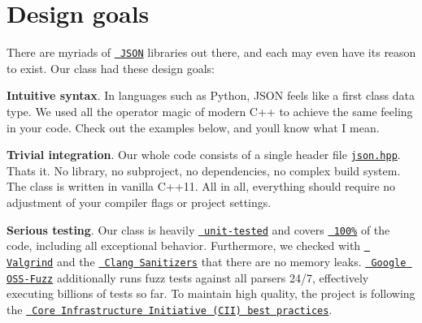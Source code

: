 \chapter{Design goals}
\hypertarget{md_build_2dt__core_2__deps_2nlohmann__json-src_2docs_2mkdocs_2docs_2home_2design__goals}{}\label{md_build_2dt__core_2__deps_2nlohmann__json-src_2docs_2mkdocs_2docs_2home_2design__goals}
\label{md_build_2dt__core_2__deps_2nlohmann__json-src_2docs_2mkdocs_2docs_2home_2design__goals_autotoc_md1481}%
%
 There are myriads of \href{https://json.org}{\texttt{ JSON}} libraries out there, and each may even have its reason to exist. Our class had these design goals\+:


\begin{DoxyItemize}
\item {\bfseries{Intuitive syntax}}. In languages such as Python, JSON feels like a first class data type. We used all the operator magic of modern C++ to achieve the same feeling in your code. Check out the examples below, and you\textquotesingle{}ll know what I mean.
\item {\bfseries{Trivial integration}}. Our whole code consists of a single header file \href{https://github.com/nlohmann/json/blob/develop/single_include/nlohmann/json.hpp}{\texttt{ {\ttfamily json.\+hpp}}}. That\textquotesingle{}s it. No library, no subproject, no dependencies, no complex build system. The class is written in vanilla C++11. All in all, everything should require no adjustment of your compiler flags or project settings.
\item {\bfseries{Serious testing}}. Our class is heavily \href{https://github.com/nlohmann/json/tree/develop/test/src}{\texttt{ unit-\/tested}} and covers \href{https://coveralls.io/r/nlohmann/json}{\texttt{ 100\%}} of the code, including all exceptional behavior. Furthermore, we checked with \href{http://valgrind.org}{\texttt{ Valgrind}} and the \href{https://clang.llvm.org/docs/index.html}{\texttt{ Clang Sanitizers}} that there are no memory leaks. \href{https://github.com/google/oss-fuzz/tree/master/projects/json}{\texttt{ Google OSS-\/\+Fuzz}} additionally runs fuzz tests against all parsers 24/7, effectively executing billions of tests so far. To maintain high quality, the project is following the \href{https://bestpractices.coreinfrastructure.org/projects/289}{\texttt{ Core Infrastructure Initiative (CII) best practices}}.
\end{DoxyItemize}

